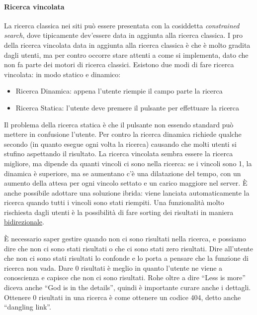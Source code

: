 \paragraph*{Ricerca vincolata}La ricerca classica nei siti pu\`o essere presentata con la cosiddetta \textit{constrained search}, dove tipicamente dev'essere data in aggiunta alla ricerca classica. I pro della ricerca vincolata data in aggiunta alla ricerca classica \`e che \`e molto gradita dagli utenti, ma per contro occorre stare attenti a come si implementa, dato che non fa parte dei motori di ricerca classici. Esistono due modi di fare ricerca vincolata: in modo statico e dinamico:
\begin{itemize}

\item Ricerca Dinamica: appena l'utente riempie il campo parte la ricerca
\item Ricerca Statica: l'utente deve premere il pulsante per effettuare la ricerca

\end{itemize}
Il problema della ricerca statica \`e che il pulsante non essendo standard pu\`o mettere in confusione l'utente. Per contro la ricerca dinamica richiede qualche secondo (in quanto esegue ogni volta la ricerca) causando che molti utenti si stufino aspettando il risultato. La ricerca vincolata sembra essere la ricerca migliore, ma dipende da quanti vincoli ci sono nella ricerca: se i vincoli sono 1, la dinamica \`e superiore, ma se aumentano c'\`e una dilatazione del tempo, con un aumento della attesa per ogni vincolo settato e un carico maggiore nel server. \`E anche possibile adottare una soluzione ibrida: viene lanciata automaticamente la ricerca quando tutti i vincoli sono stati riempiti.
Una funzionalit\`a molto rischiesta dagli utenti \`e la possibilit\`a di fare sorting dei risultati in maniera \underline{bidirezionale}.


\`E necessario saper gestire quando non ci sono risultati nella ricerca, e possiamo dire che non ci sono stati risultati o che ci sono stati zero risultati. Dire all'utente che non ci sono stati risultati lo confonde e lo porta a pensare che la funzione di ricerca non vada. Dare 0 risultati \`e meglio in quanto l'utente ne viene a conoscienza e capisce che non ci sono risultati. Rohe oltre a dire ``Less is more'' diceva anche ``God is in the details'', quindi \`e importante curare anche i dettagli. Ottenere 0 risultati in una ricerca \`e come ottenere un codice 404, detto anche ``dangling link''.
